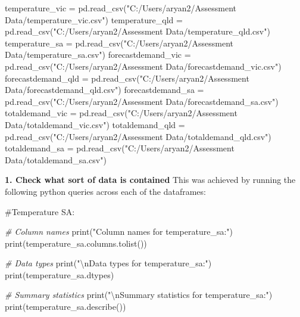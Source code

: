 \documentclass[
]{article}
\newenvironment{Shaded}{}{}
\newcommand{\BuiltInTok}[1]{\textcolor[rgb]{0.00,0.50,0.00}{#1}}
\newcommand{\CharTok}[1]{\textcolor[rgb]{0.25,0.44,0.63}{#1}}
\newcommand{\CommentTok}[1]{\textcolor[rgb]{0.38,0.63,0.69}{\textit{#1}}}
\newcommand{\NormalTok}[1]{#1}
\newcommand{\OperatorTok}[1]{\textcolor[rgb]{0.40,0.40,0.40}{#1}}
\newcommand{\StringTok}[1]{\textcolor[rgb]{0.25,0.44,0.63}{#1}}
\begin{document}
\begin{Shaded}
\begin{Highlighting}[]
\NormalTok{temperature\_vic }\OperatorTok{=}\NormalTok{ pd.read\_csv(}\StringTok{"C:/Users/aryan2/Assessment Data/temperature\_vic.csv"}\NormalTok{)}
\NormalTok{temperature\_qld }\OperatorTok{=}\NormalTok{ pd.read\_csv(}\StringTok{"C:/Users/aryan2/Assessment Data/temperature\_qld.csv"}\NormalTok{)}
\NormalTok{temperature\_sa }\OperatorTok{=}\NormalTok{ pd.read\_csv(}\StringTok{"C:/Users/aryan2/Assessment Data/temperature\_sa.csv"}\NormalTok{)}
\NormalTok{forecastdemand\_vic }\OperatorTok{=}\NormalTok{ pd.read\_csv(}\StringTok{"C:/Users/aryan2/Assessment Data/forecastdemand\_vic.csv"}\NormalTok{)}
\NormalTok{forecastdemand\_qld }\OperatorTok{=}\NormalTok{ pd.read\_csv(}\StringTok{"C:/Users/aryan2/Assessment Data/forecastdemand\_qld.csv"}\NormalTok{)}
\NormalTok{forecastdemand\_sa }\OperatorTok{=}\NormalTok{ pd.read\_csv(}\StringTok{"C:/Users/aryan2/Assessment Data/forecastdemand\_sa.csv"}\NormalTok{)}
\NormalTok{totaldemand\_vic }\OperatorTok{=}\NormalTok{ pd.read\_csv(}\StringTok{"C:/Users/aryan2/Assessment Data/totaldemand\_vic.csv"}\NormalTok{)}
\NormalTok{totaldemand\_qld }\OperatorTok{=}\NormalTok{ pd.read\_csv(}\StringTok{"C:/Users/aryan2/Assessment Data/totaldemand\_qld.csv"}\NormalTok{)}
\NormalTok{totaldemand\_sa }\OperatorTok{=}\NormalTok{ pd.read\_csv(}\StringTok{"C:/Users/aryan2/Assessment Data/totaldemand\_sa.csv"}\NormalTok{)}
\end{Highlighting}
\end{Shaded}

\textbf{1. Check what sort of data is contained} This was achieved by
running the following python queries across each of the dataframes:

\#Temperature SA:

\begin{Shaded}
\begin{Highlighting}[]
\CommentTok{\# Column names}
\BuiltInTok{print}\NormalTok{(}\StringTok{"Column names for temperature\_sa:"}\NormalTok{)}
\BuiltInTok{print}\NormalTok{(temperature\_sa.columns.tolist())}

\CommentTok{\# Data types}
\BuiltInTok{print}\NormalTok{(}\StringTok{"}\CharTok{\textbackslash{}n}\StringTok{Data types for temperature\_sa:"}\NormalTok{)}
\BuiltInTok{print}\NormalTok{(temperature\_sa.dtypes)}

\CommentTok{\# Summary statistics}
\BuiltInTok{print}\NormalTok{(}\StringTok{"}\CharTok{\textbackslash{}n}\StringTok{Summary statistics for temperature\_sa:"}\NormalTok{)}
\BuiltInTok{print}\NormalTok{(temperature\_sa.describe())}
\end{Highlighting}
\end{Shaded}
\end{document}
